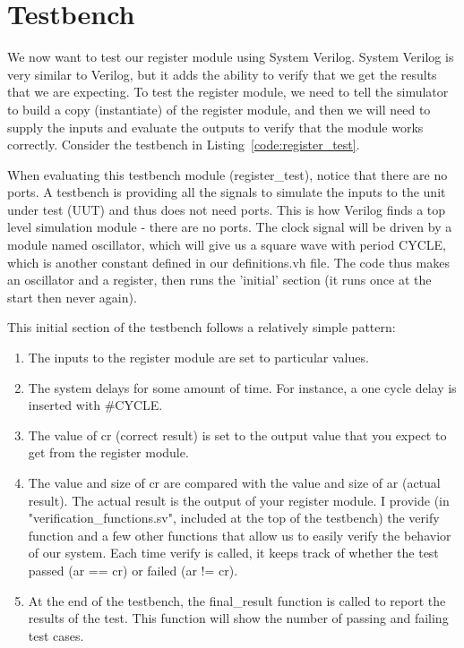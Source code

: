 \section{Testbench}

We now want to test our register module using System Verilog.  System Verilog is very similar to Verilog, but it adds the ability to verify that we get the results that we are expecting.  To test the register module, we need to tell the simulator to build a copy (instantiate) of the register module, and then we will need to supply the inputs and evaluate the outputs to verify that the module works correctly.  Consider the testbench in Listing~\ref{code:register_test}.


When evaluating this testbench module (register\_test), notice that there are no ports.  A testbench is providing all the signals to simulate the inputs to the unit under test (UUT) and thus does not need ports.  This is how Verilog finds a top level simulation module - there are no ports.  The clock signal will be driven by a module named oscillator, which will give us a square wave with period CYCLE, which is another constant defined in our definitions.vh file.  The code thus makes an oscillator and a register, then runs the 'initial' section (it runs once at the start then never again).

This initial section of the testbench follows a relatively simple pattern:
\begin{enumerate}
	\item The inputs to the register module are set to particular values.
	\item The system delays for some amount of time.  For instance, a one cycle delay is inserted with \#CYCLE.
	\item The value of cr (correct result) is set to the output value that you expect to get from the register module.
	\item The value and size of cr are compared with the value and size of ar (actual result).  The actual result is the output of your register module.  I provide (in "verification\_functions.sv", included at the top of the testbench) the verify function and a few other functions that allow us to easily verify the behavior of our system.  Each time verify is called, it keeps track of whether the test passed (ar == cr) or failed (ar != cr).
	\item At the end of the testbench, the final\_result function is called to report the results of the test.  This function will show the number of passing and failing test cases.
\end{enumerate}  


